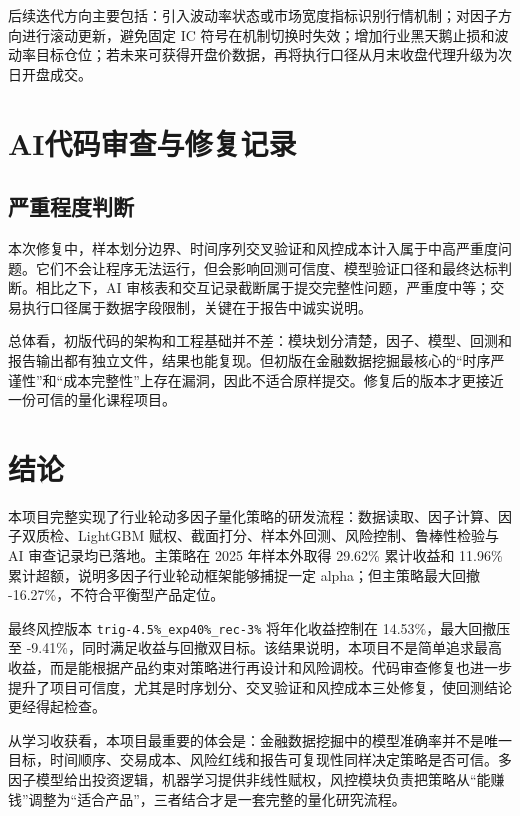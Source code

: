 \documentclass[UTF8,a4paper,12pt]{ctexart}
\begin{document}
后续迭代方向主要包括：引入波动率状态或市场宽度指标识别行情机制；对因子方向进行滚动更新，避免固定 IC 符号在机制切换时失效；增加行业黑天鹅止损和波动率目标仓位；若未来可获得开盘价数据，再将执行口径从月末收盘代理升级为次日开盘成交。

\section{AI代码审查与修复记录}

\subsection{严重程度判断}

本次修复中，样本划分边界、时间序列交叉验证和风控成本计入属于中高严重度问题。它们不会让程序无法运行，但会影响回测可信度、模型验证口径和最终达标判断。相比之下，AI 审核表和交互记录截断属于提交完整性问题，严重度中等；交易执行口径属于数据字段限制，关键在于报告中诚实说明。

总体看，初版代码的架构和工程基础并不差：模块划分清楚，因子、模型、回测和报告输出都有独立文件，结果也能复现。但初版在金融数据挖掘最核心的“时序严谨性”和“成本完整性”上存在漏洞，因此不适合原样提交。修复后的版本才更接近一份可信的量化课程项目。





\section{结论}

本项目完整实现了行业轮动多因子量化策略的研发流程：数据读取、因子计算、因子双质检、LightGBM 赋权、截面打分、样本外回测、风险控制、鲁棒性检验与 AI 审查记录均已落地。主策略在 2025 年样本外取得 29.62\% 累计收益和 11.96\% 累计超额，说明多因子行业轮动框架能够捕捉一定 alpha；但主策略最大回撤 -16.27\%，不符合平衡型产品定位。

最终风控版本 \texttt{trig-4.5\%\_exp40\%\_rec-3\%} 将年化收益控制在 14.53\%，最大回撤压至 -9.41\%，同时满足收益与回撤双目标。该结果说明，本项目不是简单追求最高收益，而是能根据产品约束对策略进行再设计和风险调校。代码审查修复也进一步提升了项目可信度，尤其是时序划分、交叉验证和风控成本三处修复，使回测结论更经得起检查。

从学习收获看，本项目最重要的体会是：金融数据挖掘中的模型准确率并不是唯一目标，时间顺序、交易成本、风险红线和报告可复现性同样决定策略是否可信。多因子模型给出投资逻辑，机器学习提供非线性赋权，风控模块负责把策略从“能赚钱”调整为“适合产品”，三者结合才是一套完整的量化研究流程。
\end{document}
